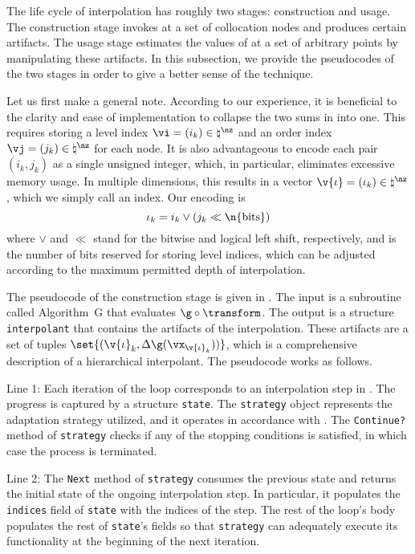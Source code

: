 The life cycle of interpolation has roughly two stages: construction and usage.
The construction stage invokes \g at a set of collocation nodes and produces
certain artifacts. The usage stage estimates the values of \g at a set of
arbitrary points by manipulating these artifacts. In this subsection, we provide
the pseudocodes of the two stages in order to give a better sense of the
technique.

Let us first make a general note. According to our experience, it is beneficial
to the clarity and ease of implementation to collapse the two sums in
 into one. This requires storing a level index $\vi =
(i_k) \in \natural^\nz$ and an order index $\vj = (j_k) \in \natural^\nz$ for
each node. It is also advantageous to encode each pair $(i_k, j_k)$ as a single
unsigned integer, which, in particular, eliminates excessive memory usage. In
multiple dimensions, this results in a vector $\v{\iota} = (\iota_k) \in
\natural^\nz$, which we simply call an index. Our encoding is
\[
  \iota_k = i_k \lor (j_k \ll \n{\mathrm{bits}})
\]
where $\lor$ and $\ll$ stand for the bitwise  and logical left shift,
respectively, and  is the number of bits reserved for storing
level indices, which can be adjusted according to the maximum permitted depth of
interpolation.

The pseudocode of the construction stage is given in .
The input is a subroutine called Algorithm~G that evaluates $\g \circ
\transform$. The output is a structure \texttt{interpolant} that contains the
artifacts of the interpolation. These artifacts are a set of tuples
$\set{(\v{\iota}_k, \Delta\g(\vx_{\v{\iota}_k}))}$, which is a comprehensive
description of a hierarchical interpolant. The pseudocode works as follows.

Line 1: Each iteration of the loop corresponds to an interpolation step \ls in
. The progress is captured by a structure
\texttt{state}. The \texttt{strategy} object represents the adaptation strategy
utilized, and it operates in accordance with . The
\texttt{Continue?} method of \texttt{strategy} checks if any of the stopping
conditions is satisfied, in which case the process is terminated.

Line 2: The \texttt{Next} method of \texttt{strategy} consumes the previous
state and returns the initial state of the ongoing interpolation step. In
particular, it populates the \texttt{indices} field of \texttt{state} with the
indices of the step. The rest of the loop's body populates the rest of
\texttt{state}'s fields so that \texttt{strategy} can adequately execute its
functionality at the beginning of the next iteration.

